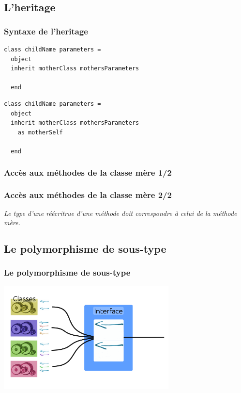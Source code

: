 \subsection{L'heritage} %
\begin{frame}[fragile]
	\frametitle{Syntaxe de l'heritage}
	\begin{lstlisting}
class childName parameters =
  object
  inherit motherClass mothersParameters

  end
	\end{lstlisting}
	\begin{lstlisting}
class childName parameters =
  object
  inherit motherClass mothersParameters 
    as motherSelf

  end
	\end{lstlisting}
\end{frame}

\begin{frame}
	\frametitle{Accès aux méthodes de la classe mère 1/2}
	
\end{frame}

\begin{frame}
	\frametitle{Accès aux méthodes de la classe mère 2/2}
	\textit{Le type d'une réécritrue d'une méthode doit correspondre à celui de la méthode mère.}
	
\end{frame}
\subsection{Le polymorphisme de sous-type} %
\begin{frame}
	\frametitle{Le polymorphisme de sous-type}
	\begin{center}
		\includegraphics[width=9cm]{pics/inclusionObjet.png}
	\end{center}
\end{frame}

